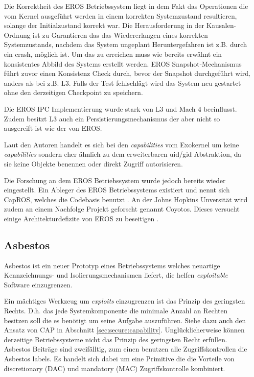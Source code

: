 \documentclass[11pt,technote]{IEEEtran}
\begin{document}
      Die Korrektheit des EROS Betriebssystem liegt in dem Fakt das Operationen die vom Kernel ausgef\"uhrt werden  
      in einem korrekten Systemzustand resultieren, solange der Initialzustand korrekt war. Die Herausforderung in der Kausalen-Ordnung ist
      zu Garantieren das das Wiedererlangen eines korrekten Systemzustands, nachdem das System ungeplant Heruntergefahren ist z.B. durch ein crash, m\"oglich ist.
      Um das zu erreichen muss wie bereits erw\"ahnt ein konsistentes Abbild des Systems erstellt werden.
      EROS Snapshot-Mechanismus f\"uhrt zuvor einen Konsistenz Check durch, bevor der Snapshot durchgef\"uhrt wird, 
      anders als bei z.B. L3. Falls der Test fehlschl\"agt wird das System neu gestartet ohne den derzeitigen Checkpoint zu speichern. 
 
      Die EROS IPC Implementierung wurde stark von L3 und Mach 4 beeinflusst. Zudem besitzt L3 auch ein Persistierungsmechanismus der aber nicht so ausgereift 
      ist wie der von EROS.
        
      Laut den Autoren \cite{inproc:eros} handelt es sich bei den \textit{capabilities} vom Exokernel um keine 
      \textit{capabilities} sondern eher \"ahnlich zu dem erweiterbaren uid/gid Abstraktion, da sie keine Objekte benennen oder direkt Zugriff autorisieren.
      
      Die Forschung an dem EROS Betriebssystem wurde jedoch bereits wieder eingestellt. Ein Ableger des EROS Betriebssystems
      existiert und nennt sich CapROS, welches die Codebasis benutzt \cite{Url:capros}. An der Johns Hopkins Unversit\"at wird zudem an einem 
      Nachfolge Projekt geforscht genannt Coyotos. Dieses versucht einige Architekturdefizite von EROS zu beseitigen \cite{Url:coyotos}.
      
    \subsection{Asbestos}        
      Asbestos ist ein neuer Prototyp eines Betriebssystems welches neuartige Kennzeichnungs- und Isolierungsmechanismen 
      liefert, die helfen \textit{exploitable} Software einzugrenzen.

      Ein m\"achtiges Werkzeug um \textit{exploits} einzugrenzen ist das Prinzip des geringsten Rechts.
      D.h. das jede Systemkomponente die minimale Anzahl an Rechten besitzen soll die es ben\"otigt um seine Aufgabe auszuf\"uhren.
      Siehe dazu auch den Ansatz von CAP in Abschnitt \ref{sec:secure:capability}. Ungl\"ucklicherweise k\"onnen derzeitige Betriebssysteme 
      nicht das Prinzip des geringsten Recht erf\"ullen. Asbestos Beitr\"age sind zweif\"alltig, zum einen benutzen alle Zugriffskontrollen die Asbestos labels. 
      Es handelt sich dabei um eine Primitive die die Vorteile von discretionary (DAC) und mandatory (MAC) Zugriffskontrolle kombiniert.
      
\end{document}
